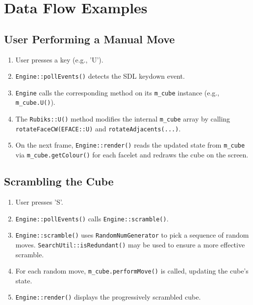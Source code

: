 \documentclass[11pt, a4paper]{article}
\begin{document}
\section{Data Flow Examples}
\subsection{User Performing a Manual Move}
\begin{enumerate}
    \item User presses a key (e.g., 'U').
    \item \texttt{Engine::pollEvents()} detects the SDL keydown event.
    \item \texttt{Engine} calls the corresponding method on its \texttt{m\_cube} instance (e.g., \texttt{m\_cube.U()}).
    \item The \texttt{Rubiks::U()} method modifies the internal \texttt{m\_cube} array by calling \texttt{rotateFaceCW(EFACE::U)} and \texttt{rotateAdjacents(...)}.
    \item On the next frame, \texttt{Engine::render()} reads the updated state from \texttt{m\_cube} via \texttt{m\_cube.getColour()} for each facelet and redraws the cube on the screen.
\end{enumerate}

\subsection{Scrambling the Cube}
\begin{enumerate}
    \item User presses 'S'.
    \item \texttt{Engine::pollEvents()} calls \texttt{Engine::scramble()}.
    \item \texttt{Engine::scramble()} uses \texttt{RandomNumGenerator} to pick a sequence of random moves. \texttt{SearchUtil::isRedundant()} may be used to ensure a more effective scramble.
    \item For each random move, \texttt{m\_cube.performMove()} is called, updating the cube's state.
    \item \texttt{Engine::render()} displays the progressively scrambled cube.
\end{enumerate}
\end{document}
